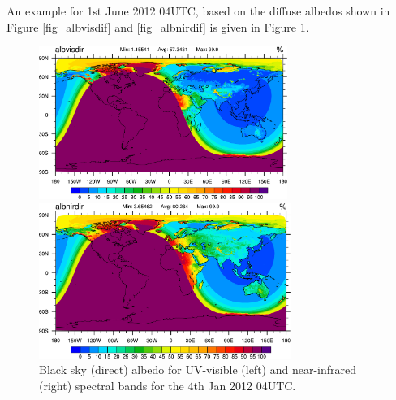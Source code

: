 \documentclass[a4paper,11pt]{article}
\begin{document}
An example for 1st June 2012 04UTC, based on the diffuse albedos shown in Figure \ref{fig_albvisdif} and \ref{fig_albnirdif} is given in Figure \ref{fig_albdir}. 
\begin{figure}[hbt]
\begin{minipage}[t]{\textwidth}
  \begin{minipage}[t]{0.498\textwidth}
    \center
    \includegraphics[width=8.1cm]{albvisdir_20120601_blacksky_ritter.png}
  \end{minipage}
  \begin{minipage}[t]{0.498\textwidth}
    \center
    \includegraphics[width=8.2cm]{albnirdir_20120601_blacksky_ritter.png}
  \end{minipage}
\end{minipage}
\caption{Black sky (direct) albedo for UV-visible (left) and near-infrared (right) spectral bands for the 4th Jan 2012 04UTC.}\label{fig_albdir}
\end{figure}
\end{document}

